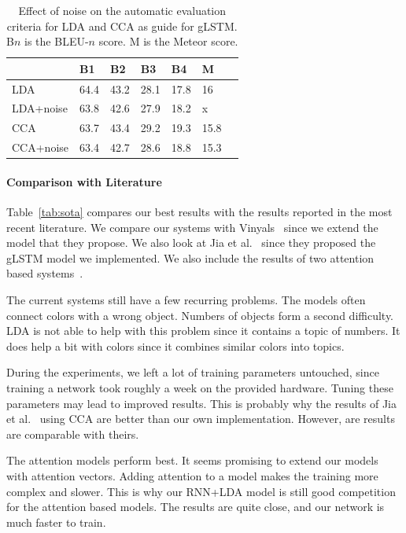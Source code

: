 \documentclass[twoside,twocolumn]{article}
\begin{document}
	\begin{table}
		\centering
		\begin{tabular}{lllllll}
			~                  & B1 & B2 & B3 & B4 & M \\ \hline
			LDA   & 64.4   & 43.2   & 28.1   & 17.8 & 16 \\
			LDA+noise   & 63.8   & 42.6   & 27.9   & 18.2 & x\\ \hline
			CCA   & 63.7   & 43.4   & 29.2   & 19.3 & 15.8 \\
			CCA+noise   & 63.4  & 42.7   & 28.6   & 18.8 & 15.3 \\ \hline			
		\end{tabular}
		\caption{Effect of noise on the automatic evaluation criteria for LDA and CCA as guide for gLSTM. B$n$ is the BLEU-$n$ score. M is the Meteor score.}
		\label{table:noisy}
	\end{table}
	
	
	
	\paragraph{Comparison with Literature}
	Table~\ref{tab:sota} compares our best results with the results reported in the most recent literature. We compare our systems with Vinyals~\cite{Google} since we extend the model that they propose. We also look at Jia et al.~\cite{Fernando2015} since they proposed the gLSTM model we implemented. We also include the results of two attention based systems~\cite{Jin2015, Xu2015}. 
	
	The current systems still have a few recurring problems. The models often connect colors with a wrong object. Numbers of objects form a second difficulty. LDA is not able to help with this problem since it contains a topic of numbers. It does help a bit with colors since it combines similar colors into topics.
	
	During the experiments, we left a lot of training parameters untouched, since training a network took roughly a week on the provided hardware. Tuning these parameters may lead to improved results. This is probably why the results of Jia et al.~\cite{Fernando2015} using CCA are better than our own implementation. However, are results are comparable with theirs. 
	
	The attention models perform best. It seems promising to extend our models with attention vectors. Adding attention to a model makes the training more complex and slower. This is why our RNN+LDA model is still good competition for the attention based models. The results are quite close, and our network is much faster to train. 
	
\end{document}
